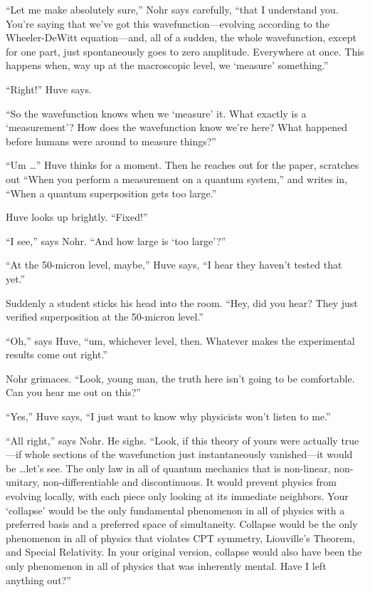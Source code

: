 {
 ``Let me make absolutely
sure,'' Nohr says carefully, ``that
I understand you. You're saying that
we've got this wavefunction---evolving according to the
Wheeler-DeWitt equation---and, all of a sudden, the whole wavefunction,
except for one part, just spontaneously goes to zero amplitude.
Everywhere at once. This happens when, way up at the macroscopic level,
we `measure'
something.''}

{
 ``Right!'' Huve says.}

{
 ``So the wavefunction knows when we
`measure' it. What exactly is a
`measurement'? How does the wavefunction
know we're here? What happened before humans were
around to measure things?''}

{
 ``Um \ldots'' Huve thinks for a
moment. Then he reaches out for the paper, scratches out
``When you perform a measurement on a quantum
system,'' and writes in, ``When a
quantum superposition gets too large.''}

{
 Huve looks up brightly.
``Fixed!''}

{
 ``I see,'' says Nohr.
``And how large is `too
large'?''}

{
 ``At the 50-micron level,
maybe,'' Huve says, ``I hear they
haven't tested that yet.''}

{
 Suddenly a student sticks his head into the room.
``Hey, did you hear? They just verified superposition
at the 50-micron level.''}

{
 ``Oh,'' says Huve,
``um, whichever level, then. Whatever makes the
experimental results come out right.''}

{
 Nohr grimaces. ``Look, young man, the truth here
isn't going to be comfortable. Can you hear me out on
this?''}

{
 ``Yes,'' Huve says,
``I just want to know why physicists
won't listen to me.''}

{
 ``All right,'' says Nohr. He
sighs. ``Look, if this theory of yours were actually
true---if whole sections of the wavefunction just instantaneously
vanished---it would be \ldots let's see. The only law in
all of quantum mechanics that is non-linear, non-unitary,
non-differentiable and discontinuous. It would prevent physics from
evolving locally, with each piece only looking at its immediate
neighbors. Your `collapse' would be the
only fundamental phenomenon in all of physics with a preferred basis
and a preferred space of simultaneity. Collapse would be the only
phenomenon in all of physics that violates CPT symmetry,
Liouville's Theorem, and Special Relativity. In your
original version, collapse would also have been the only phenomenon in
all of physics that was inherently mental. Have I left anything
out?''}

